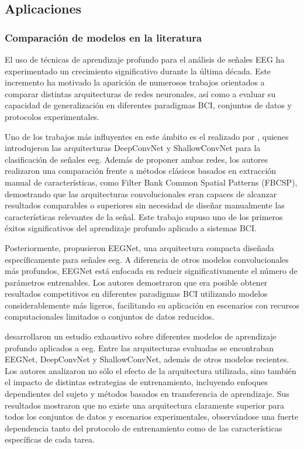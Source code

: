 
\subsection{Aplicaciones}

\subsubsection{Comparación de modelos en la literatura}

El uso de técnicas de aprendizaje profundo para el análisis de señales EEG ha experimentado un crecimiento significativo durante la última década. Este incremento ha motivado la aparición de numerosos trabajos orientados a comparar distintas arquitecturas de redes neuronales, así como a evaluar su capacidad de generalización en diferentes paradigmas BCI, conjuntos de datos y protocolos experimentales.

Uno de los trabajos más influyentes en este ámbito es el realizado por \textcite{schirrmeister_DeepLearning2017}, quienes introdujeron las arquitecturas DeepConvNet y ShallowConvNet para la clasificación de señales \acrshort{eeg}. Además de proponer ambas redes, los autores realizaron una comparación frente a métodos clásicos basados en extracción manual de características, como Filter Bank Common Spatial Patterns (FBCSP), demostrando que las arquitecturas convolucionales eran capaces de alcanzar resultados comparables o superiores sin necesidad de diseñar manualmente las características relevantes de la señal. Este trabajo supuso uno de los primeros éxitos significativos del aprendizaje profundo aplicado a sistemas BCI.

Posteriormente, \textcite{lawhern_EEGNetCompact2018} propusieron EEGNet, una arquitectura compacta diseñada específicamente para señales \acrshort{eeg}. A diferencia de otros modelos convolucionales más profundos, EEGNet está enfocada en reducir significativamente el número de parámetros entrenables. Los autores demostraron que era posible obtener resultados competitivos en diferentes paradigmas BCI utilizando modelos considerablemente más ligeros, facilitando su aplicación en escenarios con recursos computacionales limitados o conjuntos de datos reducidos.

\textcite{kollod_DeepComparisons2023} desarrollaron un estudio exhaustivo sobre diferentes modelos de aprendizaje profundo aplicados a \acrshort{eeg}. Entre las arquitecturas evaluadas se encontraban EEGNet, DeepConvNet y ShallowConvNet, además de otros modelos recientes. Los autores analizaron no sólo el efecto de la arquitectura utilizada, sino también el impacto de distintas estrategias de entrenamiento, incluyendo enfoques dependientes del sujeto y métodos basados en transferencia de aprendizaje. Sus resultados mostraron que no existe una arquitectura claramente superior para todos los conjuntos de datos y escenarios experimentales, observándose una fuerte dependencia tanto del protocolo de entrenamiento como de las características específicas de cada tarea.

